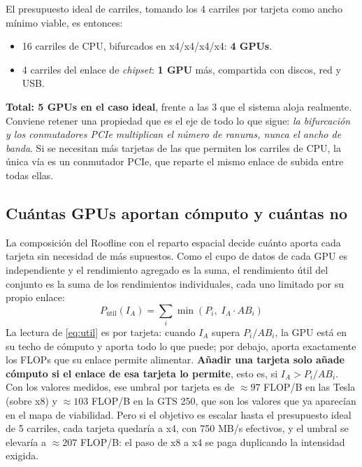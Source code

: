 \documentclass[a4paper,11pt]{article}
\begin{document}
El presupuesto ideal de carriles, tomando los 4 carriles por tarjeta como ancho mínimo viable, es entonces:
\begin{itemize}[leftmargin=*,itemsep=2pt]
    \item 16 carriles de CPU, bifurcados en x4/x4/x4/x4: \textbf{4 GPUs}.
    \item 4 carriles del enlace de \textit{chipset}: \textbf{1 GPU} más, compartida con discos, red y USB.
\end{itemize}
\textbf{Total: 5 GPUs en el caso ideal}, frente a las 3 que el sistema aloja realmente. Conviene retener una propiedad que es el eje
de todo lo que sigue: \emph{la bifurcación y los conmutadores PCIe multiplican el número de ranuras, nunca el ancho de banda}. Si
se necesitan más tarjetas de las que permiten los carriles de CPU, la única vía es un conmutador PCIe, que reparte el mismo enlace
de subida entre todas ellas.

\subsection*{Cuántas GPUs aportan cómputo y cuántas no}

La composición del Roofline con el reparto espacial decide cuánto aporta cada tarjeta sin necesidad de más supuestos. Como el cupo
de datos de cada GPU es independiente y el rendimiento agregado es la suma, el rendimiento útil del conjunto es la suma de los
rendimientos individuales, cada uno limitado por su propio enlace:
\begin{equation}\label{eq:util}
    P_{\text{útil}}(I_A) = \sum_i \min\left(P_i,\; I_A \cdot AB_i\right)
\end{equation}
La lectura de \eqref{eq:util} es por tarjeta: cuando $I_A$ supera $P_i / AB_i$, la GPU está en su techo de cómputo y aporta todo lo
que puede; por debajo, aporta exactamente los FLOPs que su enlace permite alimentar. \textbf{Añadir una tarjeta solo añade cómputo
si el enlace de esa tarjeta lo permite}, esto es, si $I_A > P_i / AB_i$. Con los valores medidos, ese umbral por tarjeta es de
$\approx 97$ FLOP/B en las Tesla (sobre x8) y $\approx 103$ FLOP/B en la GTS 250, que son los valores que ya aparecían en el mapa
de viabilidad. Pero si el objetivo es escalar hasta el presupuesto ideal de 5 carriles, cada tarjeta quedaría a x4, con 750 MB/s
efectivos, y el umbral se elevaría a $\approx 207$ FLOP/B: el paso de x8 a x4 se paga duplicando la intensidad exigida.
\end{document}
